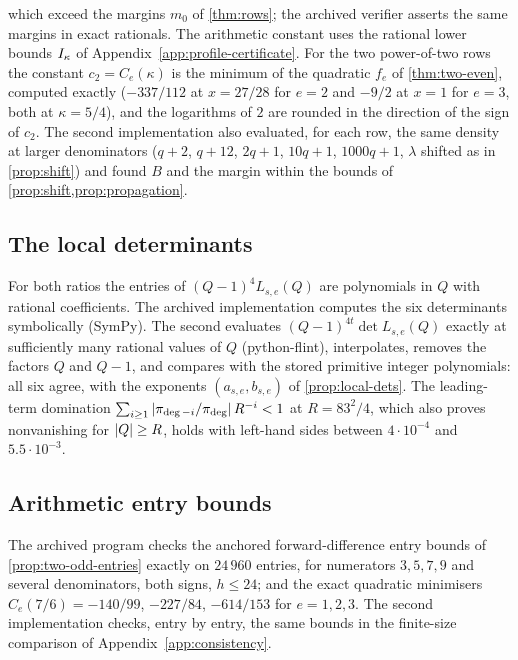 which exceed the margins $m_0$ of \cref{thm:rows}; the archived verifier asserts the same margins in
exact rationals. The arithmetic constant uses the rational lower bounds $I_\kappa$ of
Appendix~\ref{app:profile-certificate}. For the two power-of-two rows the constant $c_2=C_e(\kappa)$
is the minimum of the quadratic $f_e$ of \cref{thm:two-even}, computed exactly ($-337/112$ at
$x=27/28$ for $e=2$ and $-9/2$ at $x=1$ for $e=3$, both at $\kappa=5/4$), and the logarithms of $2$ are
rounded in the direction of the sign of $c_2$. The second implementation also evaluated, for each row, the same density at
larger denominators ($q+2$, $q+12$, $2q+1$, $10q+1$, $1000q+1$, $\lambda$ shifted as in
\cref{prop:shift}) and found $B$ and the margin within the bounds of \cref{prop:shift,prop:propagation}.

\subsection{The local determinants}\label{app:local-certificates}

For both ratios the entries of $(Q-1)^4L_{s,e}(Q)$ are polynomials in $Q$ with rational
coefficients. The archived implementation computes the six determinants symbolically (SymPy). The
second evaluates $(Q-1)^{4t}\det L_{s,e}(Q)$ exactly at sufficiently many rational values of $Q$
(python-flint), interpolates, removes the factors $Q$ and $Q-1$, and compares with the stored
primitive integer polynomials: all six agree, with the exponents $(a_{s,e},b_{s,e})$ of
\cref{prop:local-dets}. The leading-term domination
$\sum_{i\ge1}\left\lvert \pi_{\deg-i}/\pi_{\deg}\right\rvert R^{-i}<1$ at $R=83^2/4$, which also proves
nonvanishing for $\left\lvert Q\right\rvert\ge R$, holds with left-hand sides between $4\cdot10^{-4}$ and $5.5\cdot10^{-3}$.

\subsection{Arithmetic entry bounds}\label{app:entry-certificates}

The archived program checks the anchored forward-difference entry bounds of
\cref{prop:two-odd-entries} exactly on $24\,960$ entries, for numerators $3,5,7,9$ and several
denominators, both signs, $h\le24$; and the exact quadratic minimisers $C_e(7/6)=-140/99$, $-227/84$,
$-614/153$ for $e=1,2,3$. The second implementation checks, entry by entry, the same bounds in
the finite-size comparison of Appendix~\ref{app:consistency}.
